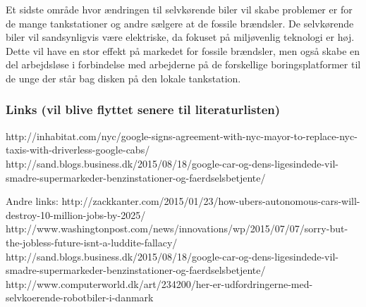 Et sidste område hvor ændringen til selvkørende biler vil skabe problemer er for de mange tankstationer og andre sælgere at de fossile brændsler. De selvkørende biler vil sandsynligvis være elektriske, da fokuset på miljøvenlig teknologi er høj. Dette vil have en stor effekt på markedet for fossile brændsler, men også skabe en del arbejdsløse i forbindelse med arbejderne på de forskellige boringsplatformer til de unge der står bag disken på den lokale tankstation.

\subsubsection{Links (vil blive flyttet senere til literaturlisten)}
http://inhabitat.com/nyc/google-signs-agreement-with-nyc-mayor-to-replace-nyc-taxis-with-driverless-google-cabs/ 
http://sand.blogs.business.dk/2015/08/18/google-car-og-dens-ligesindede-vil-smadre-supermarkeder-benzinstationer-og-faerdselsbetjente/


Andre links:
http://zackkanter.com/2015/01/23/how-ubers-autonomous-cars-will-destroy-10-million-jobs-by-2025/
http://www.washingtonpost.com/news/innovations/wp/2015/07/07/sorry-but-the-jobless-future-isnt-a-luddite-fallacy/
http://sand.blogs.business.dk/2015/08/18/google-car-og-dens-ligesindede-vil-smadre-supermarkeder-benzinstationer-og-faerdselsbetjente/
http://www.computerworld.dk/art/234200/her-er-udfordringerne-med-selvkoerende-robotbiler-i-danmark
